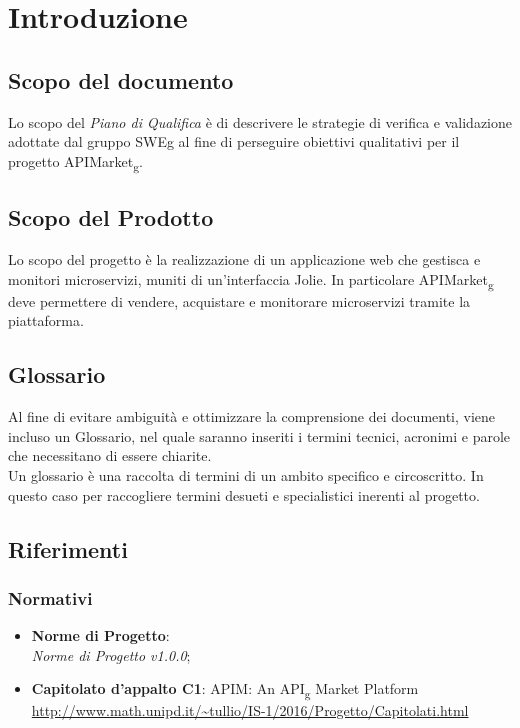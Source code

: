 \documentclass[12pt,a4paper,titlepage]{article}
\begin{document}
	\newpage
	
	\tableofcontents
	\thispagestyle{empty}
	
	\newpage

	\section{Introduzione}
	\subsection{Scopo del documento}
	Lo scopo del \textit{Piano di Qualifica} è di descrivere le strategie di verifica e validazione adottate dal gruppo SWEg al fine di perseguire obiettivi qualitativi per il progetto APIMarket\textsubscript{g}.
	
	\subsection{Scopo del Prodotto}
	Lo scopo del progetto è la realizzazione di un applicazione web che gestisca e monitori microservizi, muniti di un'interfaccia Jolie. In particolare APIMarket\textsubscript{g} deve permettere di vendere, acquistare e monitorare microservizi tramite la piattaforma.
	
	\subsection{Glossario}
	Al fine di evitare ambiguità e ottimizzare la comprensione dei documenti, viene incluso un Glossario, nel quale saranno inseriti i termini tecnici, acronimi e parole che necessitano di essere chiarite.\\
	Un glossario è una raccolta di termini di un ambito specifico e circoscritto. In questo caso per raccogliere termini desueti e specialistici inerenti al progetto.
	
	\subsection{Riferimenti}
	\subsubsection{Normativi}
	\begin{itemize}
		\item \textbf{Norme di Progetto}:\\
		\textit{Norme di Progetto v1.0.0};
		\item \textbf{Capitolato d'appalto C1}: APIM: An API\textsubscript{g} Market Platform\\
			\textcolor{blue}{\url{http://www.math.unipd.it/~tullio/IS-1/2016/Progetto/Capitolati.html}}
	\end{itemize}
\end{document}
